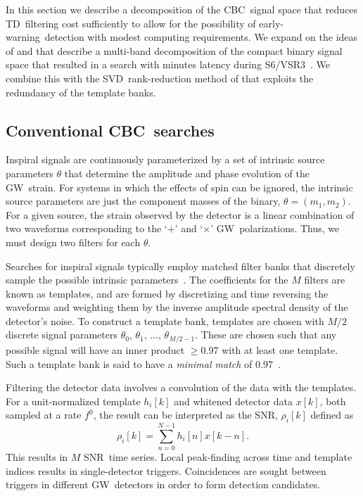 \documentclass[preprint2]{aastex}
\newcommand{\earlywarning}{early-warning}
\newcommand{\GW}{GW}%
\newcommand{\CBC}{CBC}%
\newcommand{\SNR}{SNR}%
\newcommand{\numtmps}{\ensuremath{M}}
\newcommand{\SVD}{SVD}%
\newcommand{\TD}{TD}%
\begin{document}
In this section we describe a decomposition of the \CBC\ signal space that
reduces \TD\ filtering cost sufficiently to allow for the
possibility of \earlywarning\ detection with modest computing requirements.  We
expand on the ideas of \citet{Marion2004} and \citet{Buskulic2010} that describe a
multi-band decomposition of the compact binary signal space that resulted in
a search with minutes latency during S6/VSR3~\citep{HugheyGWPAW2011}.  We combine this
with the \SVD\ rank-reduction method of \citet{Cannon:2010p10398} that exploits
the redundancy of the template banks.

\subsection{Conventional \CBC\ searches}

Inspiral signals are continuously parameterized by a set of intrinsic source
parameters $\theta$ that determine the amplitude and phase evolution of the
\GW\ strain. For systems in which the effects of spin can be ignored, the intrinsic
source parameters are just the component masses of the binary,
 $\theta = (m_1, m_2)$. For a given source, the strain observed by the
 detector is a linear combination of two waveforms corresponding to the
`$+$' and `$\times$' \GW\ polarizations.  Thus, we must design two filters
for each $\theta$.

Searches for inspiral signals typically employ matched filter
banks that discretely sample the possible intrinsic parameters~\citep{findchirppaper}.
The coefficients for the $\numtmps$ filters are known as templates, 
and are formed by discretizing and time reversing the
waveforms and weighting them by the inverse amplitude spectral density of the
detector's noise.
To construct a template bank, templates are chosen with
$\numtmps/2$ discrete signal parameters $\theta_0,\, \theta_1,\, \dots,\,
\theta_{\numtmps/2-1}$. These are chosen such that any possible signal
will have an inner product $\geqslant$0.97 with at least one template.
Such a template bank is said to have a {\em minimal match} of 0.97~\citep{Owen:1998dk}.

Filtering the detector data involves a convolution of the data with the
templates.  For a unit-normalized template $h_i[k]$ and whitened detector data
$x[k]$, both sampled at a rate $f^0$, the result can be interpreted as the
\SNR, $\rho_i[k]$ defined as
%
%
\begin{equation}
	\label{eq:SNRTD}
	\rho_i [k] = \sum_{n=0}^{N-1} h_{i}[n] x [k-n].
\end{equation}
This results in $\numtmps$ \SNR\ time series. Local peak-finding across time and
template indices results in single-detector triggers.  Coincidences are sought
between triggers in different \GW\ detectors in order to form detection candidates.
\end{document}
